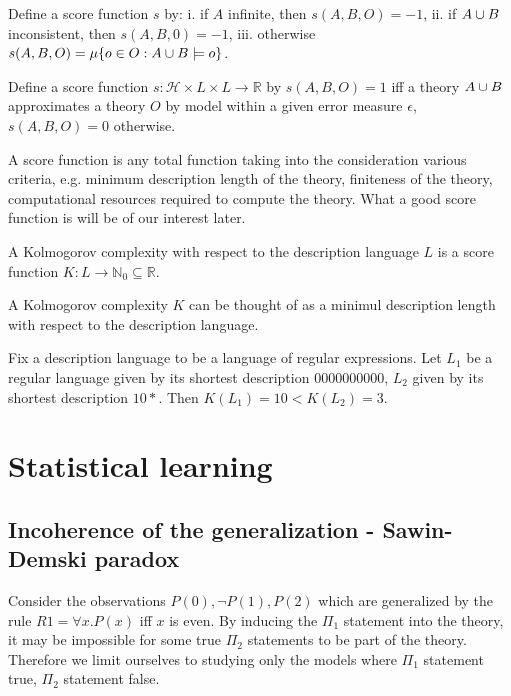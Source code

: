 \begin{exmp}
Define a score function $s$ by:
i. if $A$ infinite, then $s(A,B,O)=-1$,
ii. if $A \cup B$ inconsistent, then $s(A,B,0)=-1$,
iii. otherwise $s(A,B,O)=\mu\{o \in O : A \cup B \models o\}$.
\end{exmp}

\begin{exmp}
Define a score function $s:\mathcal{H} \times L \times L \to \mathbb{R}$ by $s(A,B,O)=1$ iff a theory $A \cup B$ approximates a theory $O$ by model within a given error measure $\epsilon$, $s(A,B,O)=0$ otherwise.
\end{exmp}

\begin{note}
A score function is any total function taking into the consideration various criteria, e.g. minimum description length of the theory, finiteness of the theory, computational resources required to compute the theory. What a good score function is will be of our interest later.
\end{note}

\begin{exmp}
A Kolmogorov complexity with respect to the description language $L$ is a score function $K:L \to \mathbb{N}_0 \subseteq \mathbb{R}$.
\end{exmp}

\begin{note}
A Kolmogorov complexity $K$ can be thought of as a minimul description length with respect to the description language.
\end{note}
\begin{exmp}
Fix a description language to be a language of regular expressions. Let $L_1$ be a regular language given by its shortest description $0000000000$, $L_2$ given by its shortest description $10*$. Then $K(L_1)=10<K(L_2)=3$.
\end{exmp}

\chapter{Statistical learning}

\section{Incoherence of the generalization - Sawin-Demski paradox}
Consider the observations $P(0), \neg P(1), P(2)$ which are generalized by the rule $R1=\forall x. P(x)$ iff $x$ is even.
By inducing the $\Pi_1$ statement into the theory, it may be impossible for some true $\Pi_2$ statements to be part of the theory\cite{sawin2013}.
Therefore we limit ourselves to studying only the models where $\Pi_1$ statement true, $\Pi_2$ statement false.
